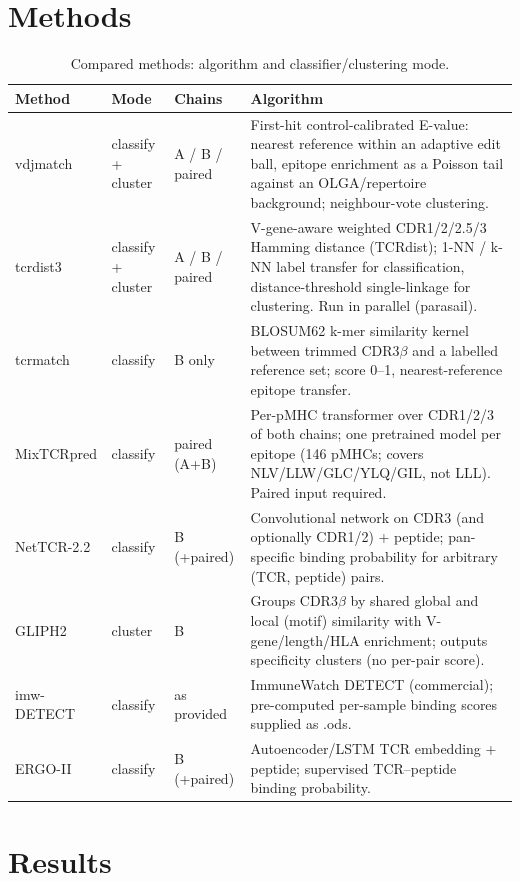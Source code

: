 \documentclass[11pt]{article}
\begin{document}
\section{Methods}
\begin{table}[htbp]\centering
\caption{Compared methods: algorithm and classifier/clustering mode.}\label{tab:methods}
\footnotesize
\begin{tabular}{llp{2.1cm}p{8.2cm}}\toprule
Method & Mode & Chains & Algorithm \\\midrule
vdjmatch & classify + cluster & A / B / paired & First-hit control-calibrated E-value: nearest reference within an adaptive edit ball, epitope enrichment as a Poisson tail against an OLGA/repertoire background; neighbour-vote clustering. \\
tcrdist3 & classify + cluster & A / B / paired & V-gene-aware weighted CDR1/2/2.5/3 Hamming distance (TCRdist); 1-NN / k-NN label transfer for classification, distance-threshold single-linkage for clustering. Run in parallel (parasail). \\
tcrmatch & classify & B only & BLOSUM62 k-mer similarity kernel between trimmed CDR3$\beta$ and a labelled reference set; score 0--1, nearest-reference epitope transfer. \\
MixTCRpred & classify & paired (A+B) & Per-pMHC transformer over CDR1/2/3 of both chains; one pretrained model per epitope (146 pMHCs; covers NLV/LLW/GLC/YLQ/GIL, not LLL). Paired input required. \\
NetTCR-2.2 & classify & B (+paired) & Convolutional network on CDR3 (and optionally CDR1/2) + peptide; pan-specific binding probability for arbitrary (TCR, peptide) pairs. \\
GLIPH2 & cluster & B & Groups CDR3$\beta$ by shared global and local (motif) similarity with V-gene/length/HLA enrichment; outputs specificity clusters (no per-pair score). \\
imw-DETECT & classify & as provided & ImmuneWatch DETECT (commercial); pre-computed per-sample binding scores supplied as .ods. \\
ERGO-II & classify & B (+paired) & Autoencoder/LSTM TCR embedding + peptide; supervised TCR--peptide binding probability. \\
\bottomrule\end{tabular}
\end{table}

\section{Results}
\end{document}
